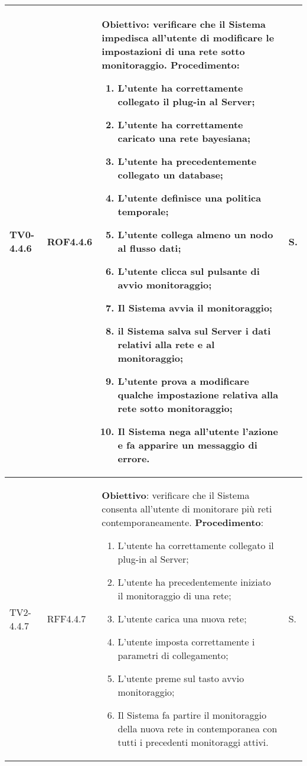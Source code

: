 \begin{longtable}{|C{.15\textwidth}|C{.13\textwidth}|m{.65\textwidth}|C{.08\textwidth}|}
TV0-4.4.6 & ROF4.4.6 &
	\textbf{Obiettivo}: verificare che il Sistema impedisca all'utente di modificare le impostazioni di una rete sotto monitoraggio. \newline
	\textbf{Procedimento}:
	\begin{enumerate}
		\item L'utente ha correttamente collegato il plug-in al Server;
		\item L'utente ha correttamente caricato una rete bayesiana;
		\item L'utente ha precedentemente collegato un database;
		\item L'utente definisce una politica temporale;
		\item L'utente collega almeno un nodo al flusso dati;
		\item L'utente clicca sul pulsante di avvio monitoraggio;							\item Il Sistema avvia il monitoraggio;
		\item il Sistema salva sul Server i dati relativi alla rete e al monitoraggio;
 		\item L'utente prova a modificare qualche impostazione relativa alla rete sotto monitoraggio;
 		\item Il Sistema nega all'utente l'azione e fa apparire un messaggio di errore.
	\end{enumerate}
	& S. \\
\hline

TV2-4.4.7 & RFF4.4.7 &
	\textbf{Obiettivo}: verificare che il Sistema consenta all'utente di monitorare più reti contemporaneamente. \newline
	\textbf{Procedimento}:
	\begin{enumerate}
		\item L'utente ha correttamente collegato il plug-in al Server;
		\item L'utente ha precedentemente iniziato il monitoraggio di una rete;
		\item L'utente carica una nuova rete;
		\item L'utente imposta correttamente i parametri di collegamento;
		\item L'utente preme sul tasto avvio monitoraggio;
		\item Il Sistema fa partire il monitoraggio della nuova rete in contemporanea con tutti i precedenti monitoraggi attivi.
	\end{enumerate}
	& S. \\
\hline


\end{longtable}
